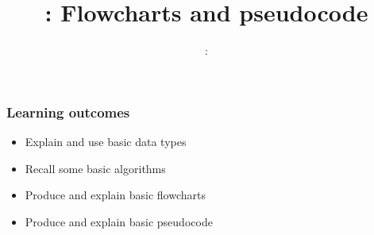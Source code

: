 \usepackage{../../beamerthemeFalmouthGamesAcademy}
\usepackage[utf8]{inputenc}
\usepackage{multimedia}
\graphicspath{ {../../} }

\lstset{language=Python
}

\usepackage[normalem]{ulem}
\usepackage{wasysym}

\usepackage{algpseudocode}

\usepackage{pdfpages}

\usetikzlibrary{arrows,automata}




\title{\sessionnumber: Flowcharts and pseudocode}
\subtitle{\modulecode: \moduletitle}

\frame{\titlepage} 

\begin{frame}
	\frametitle{Learning outcomes}
	\begin{itemize}
		\item Explain and use basic data types
		\item Recall some basic algorithms
		\item Produce and explain basic flowcharts
		\item Produce and explain basic pseudocode
	\end{itemize}
\end{frame}








